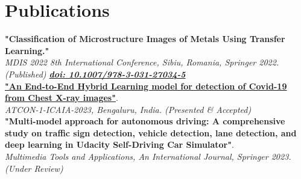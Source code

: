 \documentclass[letterpaper]{deedy-resume} %
\begin{document}
\begin{minipage}[t]{0.33\textwidth}
\sectionspace %



\vspace{-2.5mm}

\section{Publications}


\textbf{"Classification of Microstructure Images of Metals Using Transfer Learning."} \\ 
\textit{MDIS 2022 8th International Conference, Sibiu, Romania, Springer 2022. (Published) \href{https://doi.org/10.1007/978-3-031-27034-5_9}{\textbf{doi: 10.1007/978-3-031-27034-5}}}\\
\vspace{1mm}
\href{https://drive.google.com/file/d/1dUAJnwdKx-RGBg1zLtJaPHlck2hEG5aI/view?usp=sharing}{\textbf{"An End-to-End Hybrid Learning model for detection of Covid-19 from Chest X-ray images"}}. \\ 
\textit{ATCON-1-ICAIA-2023, Bengaluru, India. (Presented \& Accepted)}\\
\vspace{1mm}
\textbf{"Multi-model approach for autonomous driving: A comprehensive study on traffic sign detection, vehicle detection, lane detection, and deep learning in Udacity Self-Driving Car Simulator"}. \\
\textit{Multimedia Tools and Applications, An International Journal, Springer 2023. \\ (Under Review)}\\
    
\sectionspace %


\end{minipage} %
\hfill
%
%
\end{document}
